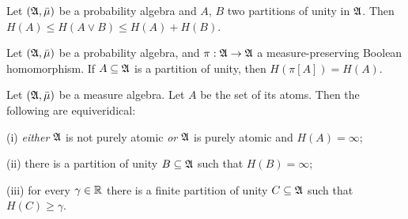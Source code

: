 Let $(\frak A,\bar\mu)$ be a probability
algebra and $A$, $B$ two partitions of unity in $\frak A$.   Then
$H(A)\le H(A\vee B)\le H(A)+H(B)$.
     
     
Let $(\frak A,\bar\mu)$ be a probability algebra,
and $\pi:\frak A\to\frak A$ a measure-preserving Boolean homomorphism.
If $A\subseteq \frak A$ is a partition of unity, then $H(\pi[A])=H(A)$.
     
     
Let $(\frak A,\bar\mu)$ be a measure algebra.   Let
$A$ be the set of its atoms.   Then the following are equiveridical:
     
(i) {\it either} $\frak A$ is not purely atomic {\it or}  $\frak A$ is
purely atomic and $H(A)=\infty$;
     
(ii) there is a partition of unity $B\subseteq\frak A$ such that
$H(B)=\infty$;
     
(iii) for every $\gamma\in\Bbb R$ there is a finite partition of unity
$C\subseteq\frak A$ such that $H(C)\ge\gamma$.
     

